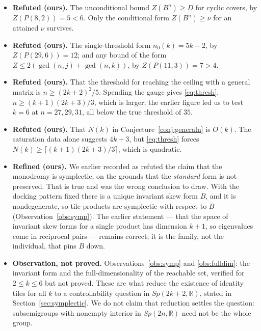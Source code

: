 \documentclass[11pt]{article}
\theoremstyle{definition}
\begin{document}
\begin{itemize}
\item \textbf{Refuted (ours).} The unconditional bound $Z(B^n)\ge D$ for cyclic
covers, by $Z(P(8,2))=5<6$. Only the conditional form
$Z(B^n)\ge\nu$ for an attained $\nu$ survives.

\item \textbf{Refuted (ours).} The single-threshold form $n_0(k)=5k-2$, by
$Z(P(29,6))=12$; and any bound of the form
$Z\le2(\gcd(n,j)+\gcd(n,k))$, by $Z(P(11,3))=7>4$.

\item \textbf{Refuted (ours).} That the threshold for reaching the ceiling with
a general matrix is $n\ge(2k+2)^{2}/5$. Spending the gauge gives
\eqref{eq:thresh}, $n\ge(k+1)(2k+3)/3$, which is larger; the earlier figure led
us to test $k=6$ at $n=27,29,31$, all below the true threshold of $35$.

\item \textbf{Refuted (ours).} That $N(k)$ in Conjecture~\ref{conj:generaln} is
$O(k)$. The saturation data alone suggests $4k+3$, but \eqref{eq:thresh} forces
$N(k)\ge\lceil(k+1)(2k+3)/3\rceil$, which is quadratic.

\item \textbf{Refined (ours).} We earlier recorded as refuted the claim that
the monodromy is symplectic, on the grounds that the \emph{standard} form is not
preserved. That is true and was the wrong conclusion to draw. With the docking
pattern fixed there is a unique invariant skew form $B$, and it is
nondegenerate, so tile products are symplectic with respect to $B$
(Observation~\ref{obs:symp}). The earlier statement --- that the space of
invariant skew forms for a single product has dimension $k+1$, so eigenvalues
come in reciprocal pairs --- remains correct; it is the family, not the
individual, that pins $B$ down.

\item \textbf{Observation, not proved.} Observations~\ref{obs:symp} and
\ref{obs:fulldim}: the invariant form and the full-dimensionality of the
reachable set, verified for $2\le k\le6$ but not proved. These are what reduce
the existence of identity tiles for all $k$ to a controllability question in
$Sp(2k+2,\mathbb R)$, stated in Section~\ref{sec:symplectic}. We do not claim
that reduction settles the question: subsemigroups with nonempty interior in
$Sp(2n,\mathbb R)$ need not be the whole group.


\end{itemize}
\end{document}
